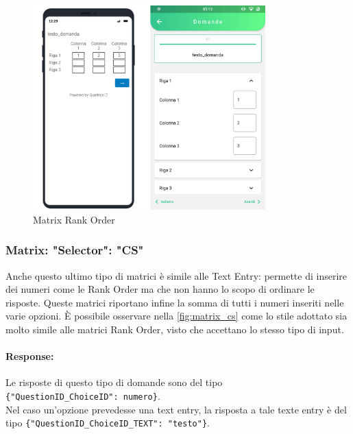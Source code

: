 \begin{figure}[h!]
\centering
\includegraphics[width=0.8\textwidth]{img/matrix_ro}
\caption{Matrix Rank Order}
\label{fig:matrix_ro}
\end{figure}

\clearpage
\subsubsection{Matrix: "Selector": "CS"}
Anche questo ultimo tipo di matrici è simile alle Text Entry: permette di inserire dei numeri come le Rank Order ma che non hanno lo scopo di ordinare le risposte. Queste matrici riportano infine la somma di tutti i numeri inseriti nelle varie opzioni. È possibile osservare nella \autoref{fig:matrix_cs} come lo stile adottato sia molto simile alle matrici Rank Order, visto che accettano lo stesso tipo di input.

\paragraph{Response:}
Le risposte di questo tipo di domande sono del tipo\\ \texttt{\{"QuestionID\_ChoiceID": numero\}}.\\Nel caso un'opzione prevedesse una text entry, la risposta a tale texte entry è del tipo \texttt{\{"QuestionID\_ChoiceID\_TEXT": "testo"\}}.

